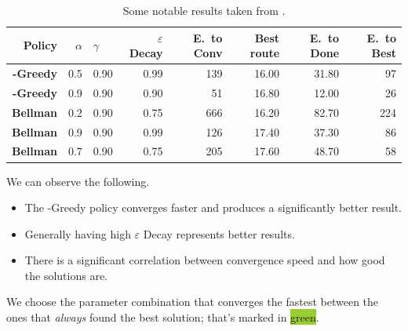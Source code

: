\begin{table}[h]
	\scriptsize
	\centering
	\begin{tabular}{>{\bfseries}r r l r | r r r r}
		\toprule
		Policy & $\alpha$ & $\gamma$ & $\varepsilon$ Decay &
		E.\ to Conv & Best route & E.\ to Done & E.\ to Best \\
		\midrule
		\rowcolor{YellowGreen}
		\textepsilon{}-Greedy & 0.5  & 0.90  & 0.99 & 139 & 16.00 & 31.80  & 97 \\
		\textepsilon{}-Greedy & 0.9 & 0.90  & 0.90 & 51  & 16.80 & 12.00  & 26 \\
		\midrule
		Bellman & 0.2 & 0.90 & 0.75 & 666  & 16.20 &  82.70 &  224 \\
		Bellman & 0.9 & 0.90 & 0.99 & 126  & 17.40 &  37.30 &   86 \\
		Bellman & 0.7 & 0.90 & 0.75 & 205  & 17.60 &  48.70 &   58 \\
		\bottomrule
	\end{tabular}
	\caption{Some notable results taken from \appendixA{}.}
	\label{param_sweep_interesting}
\end{table}

We can observe the following.
\begin{itemize}
	\item The \textepsilon{}-Greedy policy converges faster and produces a significantly better result.
	\item Generally having high $\varepsilon$ Decay represents better results.
	\item There is a significant correlation between convergence speed and how good the solutions are.
\end{itemize}

We choose the parameter combination that converges the fastest between the ones that \emph{always} found the best solution; that's marked in \colorbox{YellowGreen}{green}.
